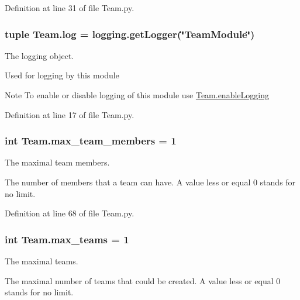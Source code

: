 Definition at line 31 of file Team.py.

\hypertarget{namespace_team_aeda58b8cc54d371e3187f3c9af31f8cf}{
\subsubsection[{log}]{\setlength{\rightskip}{0pt plus 5cm}tuple {\bf Team.log} = logging.getLogger(\char`\"{}TeamModule\char`\"{})}}
\label{namespace_team_aeda58b8cc54d371e3187f3c9af31f8cf}


The logging object. 

Used for logging by this module \begin{DoxyNote}{Note}
To enable or disable logging of this module use \hyperlink{namespace_team_a391de1d02502546ec5d88de1632b3bc2}{Team.enableLogging} 
\end{DoxyNote}


Definition at line 17 of file Team.py.

\hypertarget{namespace_team_adf6b13168904a599042d6b67dd5e773b}{
\subsubsection[{max\_\-team\_\-members}]{\setlength{\rightskip}{0pt plus 5cm}int {\bf Team.max\_\-team\_\-members} = 1}}
\label{namespace_team_adf6b13168904a599042d6b67dd5e773b}


The maximal team members. 

The number of members that a team can have. A value less or equal 0 stands for no limit. 

Definition at line 68 of file Team.py.

\hypertarget{namespace_team_aea621f4ad9dbc98e75632e31f37c4ea4}{
\subsubsection[{max\_\-teams}]{\setlength{\rightskip}{0pt plus 5cm}int {\bf Team.max\_\-teams} = 1}}
\label{namespace_team_aea621f4ad9dbc98e75632e31f37c4ea4}


The maximal teams. 

The maximal number of teams that could be created. A value less or equal 0 stands for no limit. 


